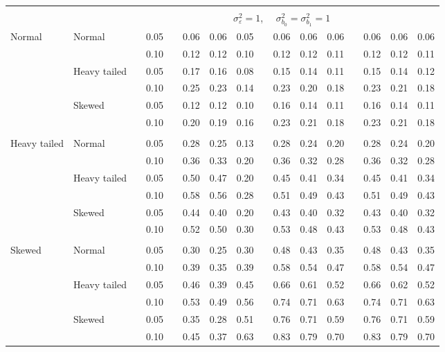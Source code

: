 \begin{table}[ht]
\begin{scriptsize}
\begin{center}
\begin{tabular}{ll p{.1cm} c p{.1cm} rrr p{.1cm} rrr p{.1cm} rrr}
&&&&&&&&&&&&&&&\\
& && && \multicolumn{9}{c}{$\sigma_{\varepsilon}^2 = 1$, \ \ $\sigma_{b_0}^2 = \sigma_{b_1}^2 = 1$} \\ \cline{6-16}

\rowcolor{gray!20}Normal       & Normal       && 0.05 &&  0.06 & 0.06 & 0.05 && 0.06 & 0.06 & 0.06 && 0.06 & 0.06 & 0.06 \\ 
\rowcolor{gray!20}             &              && 0.10 &&  0.12 & 0.12 & 0.10 && 0.12 & 0.12 & 0.11 && 0.12 & 0.12 & 0.11 \\ 
\rowcolor{gray!20}             & Heavy tailed && 0.05 &&  0.17 & 0.16 & 0.08 && 0.15 & 0.14 & 0.11 && 0.15 & 0.14 & 0.12 \\ 
\rowcolor{gray!20}             &              && 0.10 &&  0.25 & 0.23 & 0.14 && 0.23 & 0.20 & 0.18 && 0.23 & 0.21 & 0.18 \\ 
\rowcolor{gray!20}             & Skewed       && 0.05 &&  0.12 & 0.12 & 0.10 && 0.16 & 0.14 & 0.11 && 0.16 & 0.14 & 0.11 \\ 
\rowcolor{gray!20}             &              && 0.10 &&  0.20 & 0.19 & 0.16 && 0.23 & 0.21 & 0.18 && 0.23 & 0.21 & 0.18 \\ 
             &&&&&&&&&&&&&&&\\
Heavy tailed & Normal       && 0.05 &&  0.28 & 0.25 & 0.13 && 0.28 & 0.24 & 0.20 && 0.28 & 0.24 & 0.20 \\ 
             &              && 0.10 &&  0.36 & 0.33 & 0.20 && 0.36 & 0.32 & 0.28 && 0.36 & 0.32 & 0.28 \\ 
             & Heavy tailed && 0.05 &&  0.50 & 0.47 & 0.20 && 0.45 & 0.41 & 0.34 && 0.45 & 0.41 & 0.34 \\ 
             &              && 0.10 &&  0.58 & 0.56 & 0.28 && 0.51 & 0.49 & 0.43 && 0.51 & 0.49 & 0.43 \\ 
             & Skewed       && 0.05 &&  0.44 & 0.40 & 0.20 && 0.43 & 0.40 & 0.32 && 0.43 & 0.40 & 0.32 \\ 
             &              && 0.10 &&  0.52 & 0.50 & 0.30 && 0.53 & 0.48 & 0.43 && 0.53 & 0.48 & 0.43 \\
             &&&&&&&&&&&&&&&\\ 
Skewed       & Normal       && 0.05 &&  0.30 & 0.25 & 0.30 && 0.48 & 0.43 & 0.35 && 0.48 & 0.43 & 0.35 \\ 
             &              && 0.10 &&  0.39 & 0.35 & 0.39 && 0.58 & 0.54 & 0.47 && 0.58 & 0.54 & 0.47 \\ 
             & Heavy tailed && 0.05 &&  0.46 & 0.39 & 0.45 && 0.66 & 0.61 & 0.52 && 0.66 & 0.62 & 0.52 \\ 
             &              && 0.10 &&  0.53 & 0.49 & 0.56 && 0.74 & 0.71 & 0.63 && 0.74 & 0.71 & 0.63 \\ 
             & Skewed       && 0.05 &&  0.35 & 0.28 & 0.51 && 0.76 & 0.71 & 0.59 && 0.76 & 0.71 & 0.59 \\ 
             &              && 0.10 &&  0.45 & 0.37 & 0.63 && 0.83 & 0.79 & 0.70 && 0.83 & 0.79 & 0.70 \\ 



\end{tabular}
\end{center}
\end{scriptsize}
\end{table}

